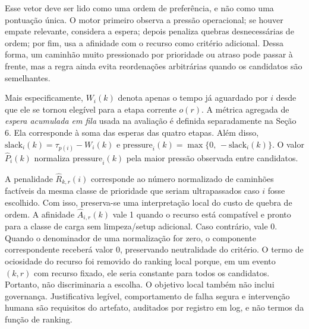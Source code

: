 \documentclass[
  12pt,
  oneside,
  a4paper,
  sumario=tradicional,
  brazil
]{abntex2}
\begin{document}
Esse vetor deve ser lido como uma ordem de prefer\^encia, e n\~ao como uma pontua\c{c}\~ao \'unica. O motor primeiro observa a press\~ao operacional; se houver empate relevante, considera a espera; depois penaliza quebras desnecess\'arias de ordem; por fim, usa a afinidade com o recurso como crit\'erio adicional. Dessa forma, um caminh\~ao muito pressionado por prioridade ou atraso pode passar \`a frente, mas a regra ainda evita reordena\c{c}\~oes arbitr\'arias quando os candidatos s\~ao semelhantes.

Mais especificamente, $W_i(k)$ denota apenas o tempo j\'a aguardado por $i$ desde que ele se tornou eleg\'ivel para a etapa corrente $o(r)$. A m\'etrica agregada de \textit{espera acumulada em fila} usada na avalia\c{c}\~ao \'e definida separadamente na Se\c{c}\~ao 6. Ela corresponde \`a soma das esperas das quatro etapas. Al\'em disso, $\text{slack}_i(k)=\tau_{p(i)}-W_i(k)$ e $\text{pressure}_i(k)=\max\{0,\,-\text{slack}_i(k)\}$. O valor $\widehat{P}_i(k)$ normaliza $\text{pressure}_i(k)$ pela maior press\~ao observada entre candidatos.

A penalidade $\widehat{R}_{k,r}(i)$ corresponde ao n\'umero normalizado de caminh\~oes fact\'iveis da mesma classe de prioridade que seriam ultrapassados caso $i$ fosse escolhido. Com isso, preserva-se uma interpreta\c{c}\~ao local do custo de quebra de ordem. A afinidade $\widehat{A}_{i,r}(k)$ vale 1 quando o recurso est\'a compat\'ivel e pronto para a classe de carga sem limpeza/setup adicional. Caso contr\'ario, vale 0. Quando o denominador de uma normaliza\c{c}\~ao for zero, o componente correspondente receber\'a valor 0, preservando neutralidade do crit\'erio. O termo de ociosidade do recurso foi removido do ranking local porque, em um evento $(k,r)$ com recurso fixado, ele seria constante para todos os candidatos. Portanto, n\~ao discriminaria a escolha. O objetivo local tamb\'em n\~ao inclui governan\c{c}a. Justificativa leg\'ivel, comportamento de falha segura e interven\c{c}\~ao humana s\~ao requisitos do artefato, auditados por registro em log, e n\~ao termos da fun\c{c}\~ao de ranking.
\end{document}
